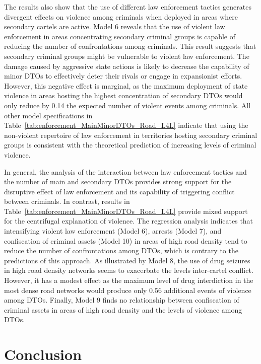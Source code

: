 \documentclass[12pt,letterpaper]{article}
\begin{document}
The results also show that the use of different law enforcement tactics generates divergent effects on violence among criminals when deployed in areas where secondary cartels are active. Model 6 reveals that the use of violent law enforcement in areas concentrating secondary criminal groups is capable of reducing the number of confrontations among criminals. This result suggests that secondary criminal groups might be vulnerable to violent law enforcement. The damage caused by aggressive state actions is likely to decrease the capability of minor DTOs to effectively deter their rivals or engage in expansionist efforts. However, this negative effect is marginal, as the maximum deployment of state violence in areas hosting the highest concentration of secondary DTOs would only reduce by 0.14 the expected number of violent events among criminals. All other model specifications in Table~\ref{tab:enforcement_MainMinorDTOs_Road_L4L} indicate that using the non-violent repertoire of law enforcement in territories hosting secondary criminal groups is consistent with the theoretical prediction of increasing levels of criminal violence. 

In general, the analysis of the interaction between law enforcement tactics and the number of main and secondary DTOs provides strong support for the disruptive effect of law enforcement and its capability of triggering conflict between criminals. In contrast, results in Table~\ref{tab:enforcement_MainMinorDTOs_Road_L4L} provide mixed support for the centrifugal explanation of violence. The regression analysis indicates that intensifying violent law enforcement (Model 6), arrests (Model 7), and confiscation of criminal assets (Model 10) in areas of high road density tend to reduce the number of confrontations among DTOs, which is contrary to the predictions of this approach. As illustrated by Model 8, the use of drug seizures in high road density networks seems to exacerbate the levels inter-cartel conflict. However, it has a modest effect as the maximum level of drug interdiction in the most dense road networks would produce only 0.56 additional events of violence among DTOs. Finally, Model 9 finds no relationship between confiscation of criminal assets in areas of high road density and the levels of violence among DTOs.    






\section*{Conclusion}
\end{document}
